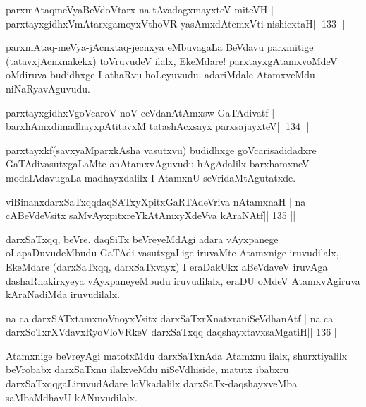 \begin{shl}
parxmAtaqmeVyaBeVdoV\s tarx na tAvadagxmayxteV miteVH |
parxtayxgidhxVmAtarxgamoyxV\s thoVR yasAmxdAtemxVti nishicxtaH\hfill || 133 ||
\end{shl}

\begin{artha}
 parxmAtaq-meVya-jAcnxtaq-jecnxya eMbuvagaLa BeVdavu parxmitige (tatavxjAcnxnakekx) toVruvudeV ilalx, EkeMdare! parxtayxgAtamxvoMdeV oMdiruva budidhxge I athaRvu hoLeyuvudu. adariMdale AtamxveMdu niNaRyavAguvudu.
\end{artha}

\begin{shl}
parxtayxgidhxVgoVcaroV noV ceVdanAtAmx\s sw GaTAdivatf |
barxhAmxdimadhayxpAtitavxM tatashAcxsayx parxsajayxteV\hfill || 134 ||
\end{shl}

\begin{artha}
parxtayxkf(savxyaMparxkAsha vasutxvu) budidhxge goVcarisadidadxre GaTAdivasutxgaLaMte anAtamxvAguvudu hAgAdalilx barxhamxneV modalAdavugaLa madhayxdalilx I AtamxnU seVridaMtAgutatxde.
\end{artha}

\begin{shl}
viBinanxdarxSaTxqqdaqSATxyXpitxGaRTAdeVriva nA\s\s tamxnaH |
na cABeVdeV\s sitx saMvAyxpitxreYkAtAmxyXdeVva kAraNAtf\hfill || 135 ||
\end{shl}

\begin{artha}
darxSaTxqq, beVre. daqSiTx beVreyeMdAgi adara vAyxpanege oLapaDuvudeMbudu GaTAdi vasutxgaLige iruvaMte Atamxnige iruvudilalx, EkeMdare (darxSaTxqq, darxSaTxvayx) I eraDakUkx aBeVdaveV iruvAga dashaRnakirxyeya vAyxpaneyeMbudu iruvudilalx, eraDU oMdeV AtamxvAgiruva kAraNadiMda iruvudilalx.
\end{artha}

\begin{shl}
na ca darxSATx\s\s tamxnoV\s noyxV\s sitx darxSaTxrXnatxraniSeVdhanAtf |
na ca darxSoTxrXVdavxRyoVloVRkeV darxSaTxqq daqshayxtavxsaMgatiH\hfill || 136 ||
\end{shl}

\begin{artha}
Atamxnige beVreyAgi matotxMdu darxSaTxnAda Atamxnu ilalx, shurxtiyalilx beVrobabx darxSaTxnu ilalxveMdu niSeVdhiside, matutx ibabxru darxSaTxqqgaLiruvudAdare loVkadalilx darxSaTx-daqshayxveMba saMbaMdhavU kANuvudilalx.
\end{artha}

